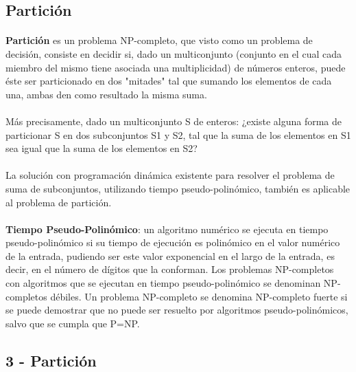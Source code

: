 \documentclass[11pt, a4paper,spanish]{article}
\begin{document}
			\subsection{Partición}

				\paragraph{}
				{\bf Partición} es un problema NP-completo, que visto como un problema de decisión, consiste en decidir si, dado un multiconjunto (conjunto en el cual cada miembro del mismo tiene asociada una multiplicidad) de números enteros, puede éste ser particionado en dos "mitades" tal que sumando los elementos de cada una, ambas den como resultado la misma suma.
			
				\paragraph{}
				Más precisamente, dado un multiconjunto S de enteros: ¿existe alguna forma de particionar S en dos subconjuntos S1 y S2, tal que la suma de los elementos en S1 sea igual que la suma de los elementos en S2?
				
				\paragraph{}
				La solución con programación dinámica existente para resolver el problema de suma de subconjuntos, utilizando tiempo pseudo-polinómico, también es aplicable al problema de partición.
			
				\paragraph{}
				{\bf Tiempo Pseudo-Polinómico}:  un algoritmo numérico se ejecuta en tiempo pseudo-polinómico si su tiempo de ejecución es polinómico en el valor numérico de la entrada, pudiendo ser este valor exponencial en el largo de la entrada, es decir, en el número de dígitos que la conforman.  Los problemas NP-completos con algoritmos que se ejecutan en tiempo pseudo-polinómico se denominan NP-completos débiles. Un problema NP-completo se denomina NP-completo fuerte si se puede demostrar que no puede ser resuelto por algoritmos pseudo-polinómicos, salvo que se cumpla que P=NP.
			
			\subsection{3 - Partición}
\end{document}
